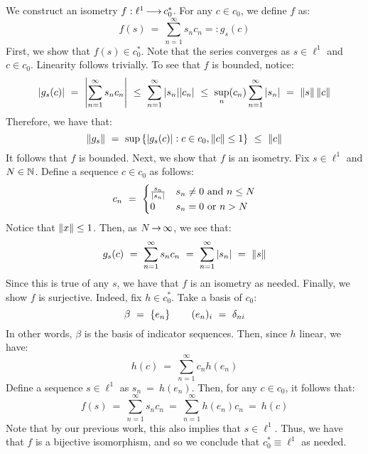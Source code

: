 \begin{soln}
    We construct an isometry $ f:\ell^{1}\operatorname{\longrightarrow} c_{0}^{*} $.
    For any $ c \in c_{0} $, we define $ f $ as:
    \begin{equation*}
        f(s) \ = \ \sum_{n=1}^{\infty}s_{n}c_{n} =: g_{s}(c)
    \end{equation*}
    First, we show that $ f(s) \in c_{0}^{*} $. Note that the series converges as
    $ s \in \ell^{1} $ and $ c \in c_{0} $. Linearity follows trivially. To see
    that $ f $ is bounded, notice:
    \begin{equation*}
        \abs{g_{s}(c)} \ = \ \abs{\sum_{n=1}^{\infty}s_{n}c_{n}} \ \leq \
        \sum_{n=1}^{\infty}\abs{s_{n}}\abs{c_{n}} \ \leq \ \sup_{n}(c_{n})
        \sum_{n=1}^{\infty}\abs{s_{n}} \ = \ \norm{s}\norm{c}
    \end{equation*}
    Therefore, we have that:
    \begin{equation*}
        \norm{g_{s}} \ = \ \sup\set{\abs{g_{s}(c)}:c\in c_{0},\norm{c}\leq1}
        \ \leq \ \norm{c}
    \end{equation*}
    It follows that $ f $ is bounded. Next, we show that $ f $ is an isometry.
    Fix $ s \in \ell^{1} $ and $ N \in \mathbb{N} $. Define a sequence $ c \in c_{0} $
    as follows:
    \begin{equation*}
        c_{n} \ = \
        \begin{cases}
            \frac{s_{n}}{\abs{s_{n}}} & s_{n}\neq0 \textrm{ and } n \leq N \\
            0 & s_{n}=0 \textrm{ or } n > N
        \end{cases}
    \end{equation*}
    Notice that $ \left\|x\right\| \leq 1 $. Then, as $ N \operatorname{\rightarrow} \infty $, we see that:
    \begin{equation*}
        g_{s}(c) \ = \ \sum_{n=1}^{\infty}s_{n}c_{n} \ = \ \sum_{n=1}^{\infty}
        \abs{s_{n}} \ = \ \left\|s\right\|
    \end{equation*}
    Since this is true of any $ s $, we have that $ f $ is an isometry as needed.
    Finally, we show $ f $ is surjective. Indeed, fix $ h \in c_{0}^{*} $. Take a
    basis of $ c_{0} $:
    \begin{equation*}
        \beta \ = \ \left\{{e_{n}}\right\} \qquad
        (e_{n})_{i} \ = \ \delta_{ni}
    \end{equation*}
    In other words, $ \beta $ is the basis of indicator sequences. Then, since
    $ h $ linear, we have:
    \begin{equation*}
        h(c) \ = \ \sum_{n=1}^{\infty}c_{n}h(e_{n})
    \end{equation*}
    Define a sequence $ s \in \ell^{1} $ as $ s_{n} \ = \ h(e_{n}) $.
    Then, for any $ c \in c_{0} $, it follows that:
    \begin{equation*}
        f(s) \ = \ \sum_{n=1}^{\infty}s_{n}c_{n} \ = \ \sum_{n=1}^{\infty}
        h(e_{n})c_{n} \ = \ h(c)
    \end{equation*}
    Note that by our previous work, this also implies that $ s \in \ell^{1} $.
    Thus, we have that $ f $ is a bijective isomorphism, and so we conclude that
    $ c_{0}^{*} \equiv \ell^{1} $ as needed.
\end{soln}


